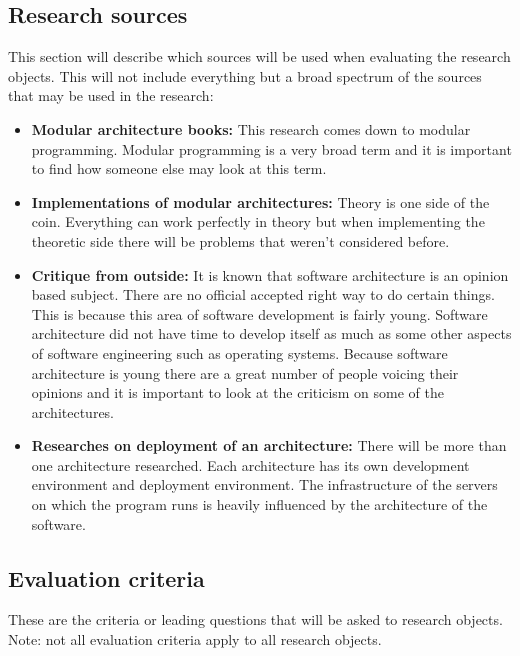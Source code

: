 \subsection{Research sources}
This section will describe which sources will be used when evaluating the research objects. This will not include everything but a broad spectrum of the sources that may be used in the research:

\begin{itemize}
	\item \textbf{Modular architecture books: }This research comes down to modular programming. Modular programming is a very broad term and it is important to find how someone else may look at this term.

	\item \textbf{Implementations of modular architectures: }Theory is one side of the coin. Everything can work perfectly in theory but when implementing the theoretic side there will be problems that weren't considered before.

	\item \textbf{Critique from outside: }It is known that software architecture is an opinion based subject. There are no official accepted right way to do certain things. This is because this area of software development is fairly young. Software architecture did not have time to develop itself as much as some other aspects of software engineering such as operating systems. Because software architecture is young there are a great number of people voicing their opinions and it is important to look at the criticism on some of the architectures.

	\item \textbf{Researches on deployment of an architecture: } There will be more than one architecture researched. Each architecture has its own development environment and deployment environment. The infrastructure of the servers on which the program runs is heavily influenced by the architecture of the software.
\end{itemize}

\subsection{Evaluation criteria}
These are the criteria or leading questions that will be asked to research objects. Note: not all evaluation criteria apply to all research objects.

